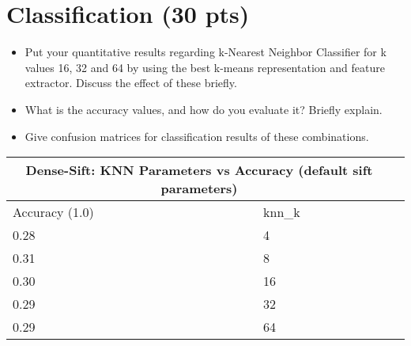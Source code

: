 \documentclass[12pt]{article}
\begin{document}
\section{Classification (30 pts)}
    \begin{itemize}
        \item Put your quantitative results regarding k-Nearest Neighbor Classifier for k values 16, 32 and 64 by using the best k-means representation and feature extractor. Discuss the effect of these briefly.
        \item What is the accuracy values, and how do you evaluate it? Briefly explain.
        \item Give confusion matrices for classification results of these combinations.
    \end{itemize}

    \vspace*{0.5cm}
        \begin{tabular}{ |p{1.5cm}||p{3cm}|p{3cm}| }
            \hline
            \multicolumn{2}{|c|}{Dense-Sift: KNN Parameters vs Accuracy (default sift parameters)} \\
            \hline
            Accuracy (1.0)  & knn\_k\\
            \hline
            0.28 & 4  \\ %
            \hline
            0.31 & 8  \\ %
            \hline
            0.30 & 16  \\ %
            \hline
            0.29 & 32  \\ %
            \hline
            0.29 & 64  \\ %
            \hline
        \end{tabular}
        
\end{document}
